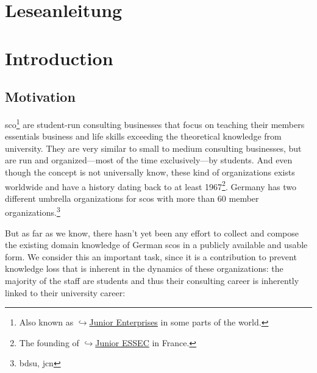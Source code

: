 \documentclass[a4paper, DIV=13, BCOR=0cm]{scrbook}
\newcommand{\link}[2]{\href{#1}{$\hookrightarrow$#2}}
\begin{document}


\chapter*{Leseanleitung}
\newpage

\tableofcontents
\newpage

\mainmatter
\chapter{Introduction }
\section{Motivation }
\gls{sco}\footnote{Also known as \link{https://en.wikipedia.org/wiki/Junior_enterprise}{Junior Enterprises} in some parts of the world.} are student-run consulting businesses that focus on teaching their members essentials business and life skills exceeding the theoretical knowledge from university. They are very similar to small to medium consulting businesses, but are run and organized---most of the time exclusively---by students. And even though the concept is not universally know, these kind of organizations exists worldwide and have a history dating back to at least 1967\footnote{The founding of \link{https://www.en.junioressec.com/}{Junior ESSEC} in France.}. Germany has two different umbrella organizations for \glspl{sco} with more than 60 member organizations.\footnote{\gls{bdsu}, \gls{jcn}}

But as far as we know, there hasn't yet been any effort to collect and compose the existing domain knowledge of German \glspl{sco} in a publicly available and usable form. We consider this an important task, since it is a contribution to prevent knowledge loss that is inherent in the dynamics of these organizations: the majority of the staff are students and thus their consulting career is inherently linked to their university career:
\end{document}
